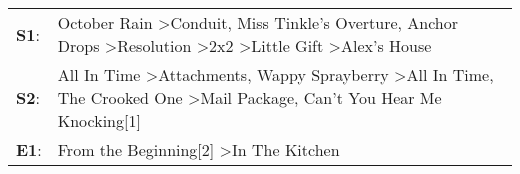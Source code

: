 \begin{supertabular}{p{0.03\textwidth}p{0.92\textwidth}}
 \textbf{S1}:  &  October Rain\textsuperscript{} \textgreater \enspace Conduit\textsuperscript{}, \enspace Miss Tinkle's Overture\textsuperscript{}, \enspace Anchor Drops\textsuperscript{} \textgreater \enspace Resolution\textsuperscript{} \textgreater \enspace 2x2\textsuperscript{} \textgreater \enspace Little Gift\textsuperscript{} \textgreater \enspace Alex's House\textsuperscript{}  \enspace  \\
 \textbf{S2}:  &                                       All In Time\textsuperscript{} \textgreater \enspace Attachments\textsuperscript{}, \enspace Wappy Sprayberry\textsuperscript{} \textgreater \enspace All In Time\textsuperscript{}, \enspace The Crooked One\textsuperscript{} \textgreater \enspace Mail Package\textsuperscript{}, \enspace Can't You Hear Me Knocking[1]\textsuperscript{}  \enspace  \\
 \textbf{E1}:  &                                                                                                                                                                                                                                                                                      From the Beginning[2]\textsuperscript{} \textgreater \enspace In The Kitchen\textsuperscript{}  \enspace  \\
\end{supertabular}
